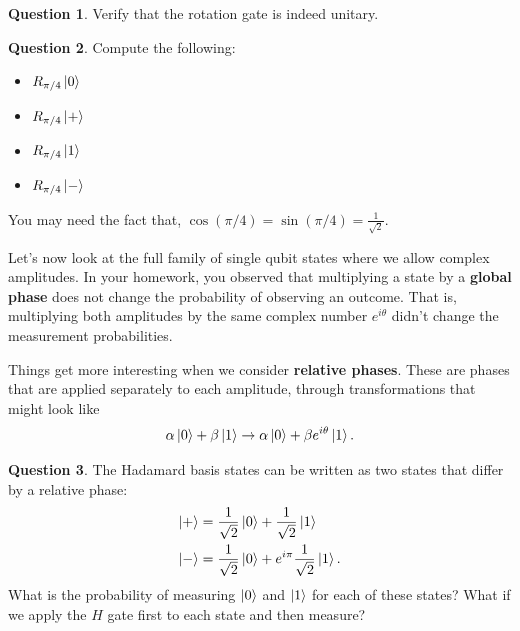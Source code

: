 \documentclass[letterpaper, 12pt]{article}
\newcommand{\1}{\mathds{1}}	%
\theoremstyle{definition}
\newtheorem{question}{Question}
\begin{document}
\begin{question}
    Verify that the rotation gate is indeed unitary. 
\end{question}

\vspace{30mm}

\begin{question}
    Compute the following:
    \begin{itemize}
        \item $R_{\pi/4} \ket{0}$ \vspace{5mm}
        \item $R_{\pi/4} \ket{+}$ \vspace{5mm}
        \item $R_{\pi/4} \ket{1}$ \vspace{5mm}
        \item $R_{\pi/4} \ket{-}$ \vspace{5mm}
    \end{itemize}
    You may need the fact that, $\cos (\pi/4) = \sin(\pi/4) = \frac{1}{\sqrt{2}}$.
\end{question}

Let's now look at the full family of single qubit states where we allow complex amplitudes. In your homework, you observed that multiplying a state by a \textbf{global phase} does not change the probability of observing an outcome. That is, multiplying both amplitudes by the same complex number $e^{i\theta}$ didn't change the measurement probabilities.

Things get more interesting when we consider \textbf{relative phases}. These are phases that are applied separately to each amplitude, through transformations that might look like 
\begin{equation}
    \alpha\ket{0} + \beta \ket{1} \rightarrow \alpha \ket{0} + \beta e^{i\theta} \ket{1}. 
\end{equation}

\begin{question}
    The Hadamard basis states can be written as two states that differ by a relative phase: 
    \begin{align}
        \ket{+} &= \frac{1}{\sqrt{2}} \ket{0} + \frac{1}{\sqrt{2}} \ket{1} \\
        \ket{-} &= \frac{1}{\sqrt{2}} \ket{0} + e^{i\pi} \frac{1}{\sqrt{2}} \ket{1}.
    \end{align}
    What is the probability of measuring $\ket{0}$ and $\ket{1}$ for each of these states? What if we apply the $H$ gate first to each state and then measure? 
\end{question}
\vspace{75mm}
\end{document}
